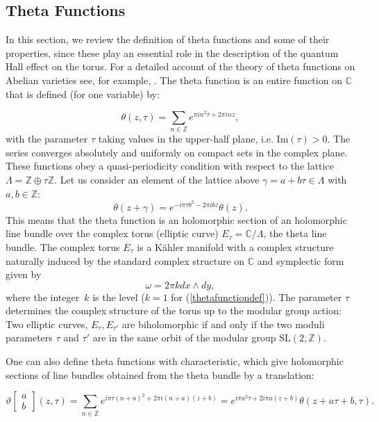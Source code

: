 \documentclass[a4paper,11pt]{article}
\begin{document}
\subsection{Theta Functions}
\label{sub:theta_functions}

In this section, we review the definition of theta functions and some of their properties, since these play an essential role in the description of the quantum Hall effect on the torus. For a detailed account of the theory of theta functions on Abelian varieties see, for example, 
\cite{kempf}.
The theta function is an entire function on $\mathbb{C}$ that is defined (for one variable) by:

\begin{equation}
\theta(z,\tau) = \sum_{n\in\mathbb{Z}} e^{\pi in^2\tau+2\pi inz},
\label{thetafunctiondef}
\end{equation}
with the parameter $\tau$ taking values in the upper-half plane, i.e. $\mathrm{Im}(\tau)>0$. The series  converges absolutely and uniformly on compact sets in the complex plane. These functions obey a quasi-periodicity condition with respect to the lattice $\Lambda=\mathbb{Z}\oplus \tau\mathbb{Z}$. Let us consider an element of the lattice above $\gamma= a + b\tau\in\Lambda$ with $a,b\in\mathbb{Z}$:
\begin{equation}
\theta(z+\gamma) = e^{-i\pi \tau b^2-2\pi ibz}\theta(z).
\label{quasiperiodicitythetafunction}
\end{equation}
This means that the theta function is an holomorphic section of an holomorphic line bundle over the complex torus (elliptic curve) $E_{\tau}=\mathbb{C}/\Lambda$, the theta line bundle. The complex torus $E_{\tau}$ is a Kähler manifold with a complex structure naturally induced by the standard complex structure on $\mathbb{C}$ and symplectic form given by 
$$\omega = 2\pi k dx \wedge dy, 
$$
where the integer $\, k$ is the level ($k=1$ for (\ref{thetafunctiondef})). The parameter $\tau$ determines the complex structure of the torus up to the modular group action: 
Two elliptic curves, $E_\tau, E_{\tau'}$ 
 are biholomorphic if and only if
the two moduli parameters $\tau$ and $\tau'$ are in the same orbit of the  modular group $\mathrm{SL}(2,\mathbb{Z})$. 

One can also define theta functions with characteristic, which give holomorphic sections of line bundles obtained from the theta bundle by a translation:

\begin{equation}
\vartheta\begin{bmatrix}
a\\
b
\end{bmatrix}(z,\tau) = \sum_{n\in\mathbb{Z}} e^{i\pi\tau(n+a)^2+2\pi i(n+a)(z+b)} = e^{i\pi a^2\tau+2i\pi a(z+b)}\theta(z+a\tau+b,\tau).
\label{eq:thetafunctionchardef}
\end{equation}
\end{document}
